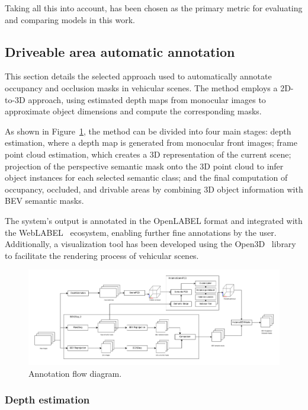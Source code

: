 Taking all this into account,  has been chosen as the primary metric for evaluating and comparing models in this work.

\subsection{Driveable area automatic annotation}
\label{sec:aplication}

This section details the selected approach used to automatically annotate occupancy and occlusion masks in vehicular scenes. The method employs a 2D-to-3D approach, using estimated depth maps from monocular images to approximate object dimensions and compute the corresponding masks.

As shown in Figure~\ref{fig:application_flow_diagram}, the method can be divided into four main stages: depth estimation, where a depth map is generated from monocular front images; frame point cloud estimation, which creates a 3D representation of the current scene; projection of the perspective semantic mask onto the 3D point cloud to infer object instances for each selected semantic class; and the final computation of occupancy, occluded, and drivable areas by combining 3D object information with BEV semantic masks.

The system's output is annotated in the OpenLABEL format and integrated with the WebLABEL~\cite{weblabel} ecosystem, enabling further fine annotations by the user. Additionally, a visualization tool has been developed using the Open3D~\cite{open3d} library to facilitate the rendering process of vehicular scenes.

\begin{figure}[h!]
    \centering
    \includegraphics[width=\linewidth]{images/methodology/Application_flow_diagram.png}
    \caption{Annotation flow diagram.}
    \label{fig:application_flow_diagram}
\end{figure}

\subsubsection{Depth estimation}
\label{sec:depth_estimation}

